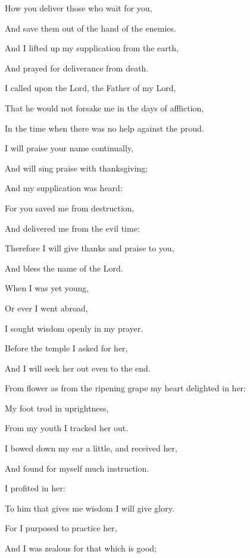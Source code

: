 {\par }{\Q How you deliver those who wait for you,
\par }{\Q And save them out of the hand of the enemies.
\par }{\Q {}And I lifted up my supplication from the earth,
\par }{\Q And prayed for deliverance from death.
\par }{\Q {}I called upon the Lord, the Father of my Lord,
\par }{\Q That he would not forsake me in the days of affliction,
\par }{\Q In the time when there was no help against the proud.
\par }{\Q {}I will praise your name continually,
\par }{\Q And will sing praise with thanksgiving;
\par }{\Q And my supplication was heard:
\par }{\Q {}For you saved me from destruction,
\par }{\Q And delivered me from the evil time:
\par }{\Q Therefore I will give thanks and praise to you,
\par }{\Q And bless the name of the Lord.
\par }{\BB \par }{\Q {}When I was yet young,
\par }{\Q Or ever I went abroad,
\par }{\Q I sought wisdom openly in my prayer.
\par }{\Q {}Before the temple I asked for her,
\par }{\Q And I will seek her out even to the end.
\par }{\Q {}From
{} flower as from the ripening grape my heart delighted in her:
\par }{\Q My foot trod in uprightness,
\par }{\Q From my youth I tracked her out.
\par }{\Q {}I bowed down my ear a little, and received her,
\par }{\Q And found for myself much instruction.
\par }{\Q {}I profited in her:
\par }{\Q To him that gives me wisdom I will give glory.
\par }{\Q {}For I purposed to practice her,
\par }{\Q And I was zealous for that which is good;
}
